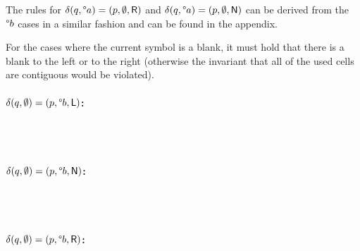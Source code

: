 \documentclass[a4paper,UKenglish,cleveref, autoref]{lipics-v2019}
\begin{document}
The rules for $\delta(q, \degree a) = (p, \emptyset, \textsf{R})$ and $\delta(q, \degree a) = (p, \emptyset, \textsf{N})$ can be derived from the $\degree b$ cases in a similar fashion and can be found in the appendix.

For the cases where the current symbol is a blank, it must hold that there is a blank to the left or to the right (otherwise the invariant that all of the used cells are contiguous would be violated).
\paragraph*{$\delta(q, \emptyset) = (p, \degree b, \textsf{L})$:}
\begin{center}
   \\[3ex]
   \\[3ex]
\end{center}

\paragraph*{$\delta(q, \emptyset) = (p, \degree b, \textsf{N})$:}
\begin{center}
   \\[3ex]
   \\[3ex]
\end{center}

\paragraph*{$\delta(q, \emptyset) = (p, \degree b, \textsf{R})$:}
\begin{center}
   \\[3ex]
   \\[3ex]
\end{center}
\end{document}
